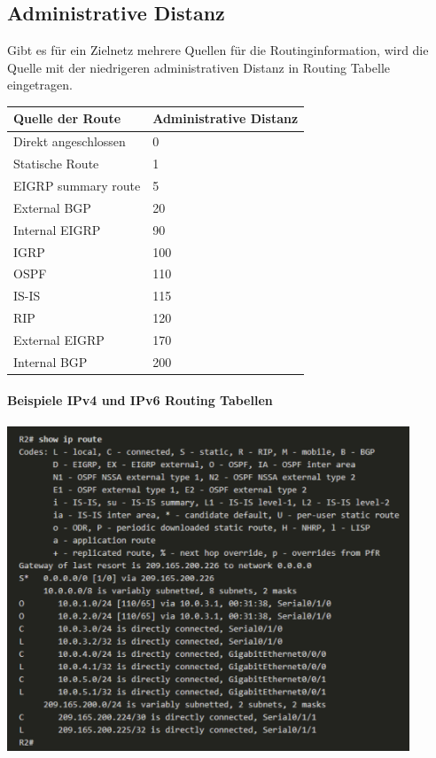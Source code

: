 \documentclass[a4paper,12pt]{article}
\begin{document}
\subsection{Administrative Distanz}
Gibt es für ein Zielnetz mehrere Quellen für die Routinginformation, wird die Quelle mit der niedrigeren administrativen Distanz in Routing Tabelle eingetragen.

\begin{center}
\begin{tabular}{ | m{4.2cm} | m{3cm} | } 
Quelle der Route & Administrative Distanz\\ 
\hline
Direkt angeschlossen & 0\\
Statische Route & 1\\
EIGRP summary route & 5\\
External BGP & 20\\
Internal EIGRP & 90\\
IGRP & 100\\
OSPF & 110\\
IS-IS & 115\\
RIP & 120\\
External EIGRP & 170\\
Internal BGP & 200\\
\end{tabular}
\end{center}

\paragraph{Beispiele IPv4 und IPv6 Routing Tabellen}

\begin{center}
\includegraphics[width=12cm]{img/11_ipv4_route.png}
\end{center}
\end{document}
